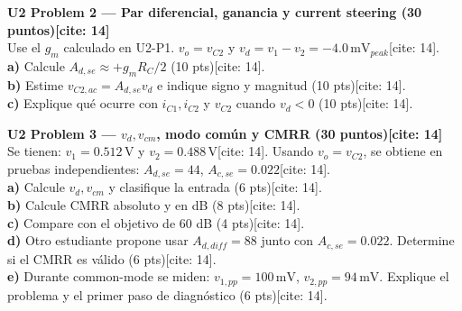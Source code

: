 \documentclass[11pt, a4paper]{article}
\begin{document}
\noindent \textbf{U2 Problem 2 — Par diferencial, ganancia y current steering (30 puntos)[cite: 14]} \\
Use el $g_m$ calculado en U2-P1. $v_o=v_{C2}$ y $v_d = v_1 - v_2 = -4.0\,\text{mV}_{peak}$[cite: 14]. \\
\textbf{a)} Calcule $A_{d,se} \approx +g_m R_C / 2$ (10 pts)[cite: 14]. \\
\textbf{b)} Estime $v_{C2,ac} = A_{d,se} v_d$ e indique signo y magnitud (10 pts)[cite: 14]. \\
\textbf{c)} Explique qué ocurre con $i_{C1}, i_{C2}$ y $v_{C2}$ cuando $v_d < 0$ (10 pts)[cite: 14].
\vspace{2.5cm}

\noindent \textbf{U2 Problem 3 — $v_d, v_{cm}$, modo común y CMRR (30 puntos)[cite: 14]} \\
Se tienen: $v_1=0.512\,\text{V}$ y $v_2=0.488\,\text{V}$[cite: 14]. Usando $v_o=v_{C2}$, se obtiene en pruebas independientes: $A_{d,se}=44$, $A_{c,se}=0.022$[cite: 14]. \\
\textbf{a)} Calcule $v_d, v_{cm}$ y clasifique la entrada (6 pts)[cite: 14]. \\
\textbf{b)} Calcule CMRR absoluto y en dB (8 pts)[cite: 14]. \\
\textbf{c)} Compare con el objetivo de 60 dB (4 pts)[cite: 14]. \\
\textbf{d)} Otro estudiante propone usar $A_{d,diff}=88$ junto con $A_{c,se}=0.022$. Determine si el CMRR es válido (6 pts)[cite: 14]. \\
\textbf{e)} Durante common-mode se miden: $v_{1,pp}=100\,\text{mV}$, $v_{2,pp}=94\,\text{mV}$. Explique el problema y el primer paso de diagnóstico (6 pts)[cite: 14].
\vspace{2.5cm}
\end{document}
